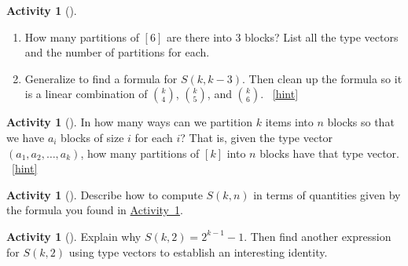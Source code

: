 \documentclass[10pt,]{book}
\theoremstyle{plain}
\theoremstyle{definition}
\theoremstyle{definition}
\theoremstyle{definition}
\newtheorem{activity}[project]{Activity}
\numberwithin{equation}{chapter}
\begin{document}
\begin{activity}[]\label{activity-268}
\leavevmode%
\begin{enumerate}[font=\bfseries,label=(\alph*),ref=\alph*]
\item\label{task-261} \hypertarget{p-1413}{}%
How many partitions of \([6]\) are there into 3 blocks?  List all the type vectors and the number of partitions for each.%
\item\label{task-262} \hypertarget{p-1414}{}%
Generalize to find a formula for \(S(k,k-3)\).  Then clean up the formula so it is a linear combination of \(\binom{k}{4}\), \(\binom{k}{5}\), and \(\binom{k}{6}\).%
~\hfill{\tiny\hyperlink{a-275.b}{[hint]}\hypertarget{q-275.b}{}}\end{enumerate}
\end{activity}
\begin{activity}[]\label{partitionsgivenpartsize}
\hypertarget{p-1416}{}%
In how many ways can we partition \(k\) items into \(n\) blocks so that we have \(a_i\) blocks of size \(i\) for each \(i\)? That is, given the type vector \((a_1, a_2, \ldots, a_k)\), how many partitions of \([k]\) into \(n\) blocks have that type vector.%
~\hfill{\tiny\hyperlink{a-276}{[hint]}\hypertarget{q-276}{}}\end{activity}
\begin{activity}[]\label{activity-270}
\hypertarget{p-1419}{}%
Describe how to compute \(S(k,n)\) in terms of quantities given by the formula you found in \hyperref[partitionsgivenpartsize]{Activity~\ref{partitionsgivenpartsize}}.%
\end{activity}
\begin{activity}[]\label{activity-271}
\hypertarget{p-1421}{}%
Explain why \(S(k, 2) = 2^{k-1} - 1\).  Then find another expression for \(S(k,2)\) using type vectors to establish an interesting identity.%
\end{activity}
\typeout{************************************************}
\typeout{************************************************}
\end{document}
